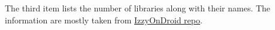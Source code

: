 The third item lists the number of libraries along with their names. The information are mostly
taken from \href{https://gitlab.com/IzzyOnDroid/repo}{IzzyOnDroid repo}.


